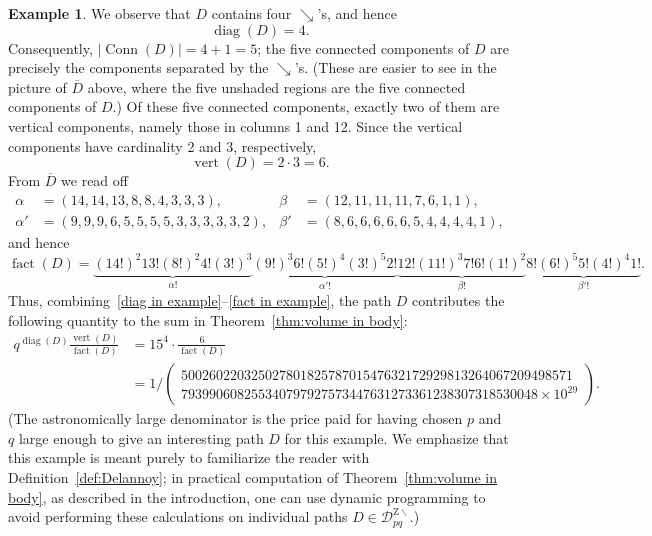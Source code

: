 \documentclass[noamsfonts,10pt]{amsart}
\newcommand{\DZ}{\mathcal{D}^{\mathrm{Z} \!\!\!\! \backslash}}
\newcommand{\al}{\alpha}
\newcommand{\be}{\beta}
\newcommand{\dd}{\operatorname{diag}}
\newcommand{\vv}{\operatorname{vert}}
\newcommand{\ff}{\operatorname{fact}}
\DeclareMathOperator{\Conn}{Conn}
\newcommand{\1}{\mathbf{1}}
\theoremstyle{plain}
\theoremstyle{definition}
\newtheorem{example}[theorem]{Example}
\numberwithin{equation}{section}
\begin{document}
\begin{example}
    \noindent We observe that $D$ contains four $\searrow$'s, and hence
    \begin{equation}
        \label{diag in example}
        \dd(D) = 4.
    \end{equation}
    Consequently, $\left|\Conn(D) \right| = 4+1=5$; the five connected components of $D$ are precisely the components separated by the $\searrow$'s.
    (These are easier to see in the picture of $\overline{D}$ above, where the five unshaded regions are the five connected components of $D$.)
    Of these five connected components, exactly two of them are vertical components, namely those in columns 1 and 12.
    Since the vertical components have cardinality 2 and 3, respectively,
    \begin{equation}
        \label{vert in example}
        \vv(D) = 2 \cdot 3 = 6.
    \end{equation}
    From $\overline{D}$ we read off
    \begin{align*}
        \al &= (14,14,13,8,8,4,3,3,3), & \be &= (12,11,11,11,7,6,1,1), \\
        \al' &= (9,9,9,6,5,5,5,5,3,3,3,3,3,2), & \be' &= (8,6,6,6,6,6,5,4,4,4,4,1),
    \end{align*}
    and hence
    \begin{equation}
        \label{fact in example}
        \ff(D) = \underbrace{(14!)^2 13! (8!)^2 4! (3!)^3}_{\al!} \underbrace{(9!)^3 6! (5!)^4 (3!)^5 2!}_{\al'!} \underbrace{12! (11!)^3 7! 6! (1!)^2}_{\be!} \underbrace{8! (6!)^5 5! (4!)^4 1!}_{\be' !}.
    \end{equation}
    Thus, combining~\eqref{diag in example}--\eqref{fact in example}, the path $D$ contributes the following quantity to the sum in Theorem~\ref{thm:volume in body}:
    \begin{align*}
        q^{\dd(D)} \frac{\vv(D)}{\ff(D)} &= 15^4 \cdot \frac{6}{\ff(D)} \\
        & = 1 \Big/ \left(  \begin{array}{l}
        50026022032502780182578701547632172929813264067209498571 \\
        793990608255340797927573447631273361238307318530048 \times 10^{29}
        \end{array}
        \right).
    \end{align*}
    (The astronomically large denominator is the price paid for having chosen $p$ and $q$ large enough to give an interesting path $D$ for this example.
    We emphasize that this example is meant purely to familiarize the reader with Definition~\ref{def:Delannoy}; in practical computation of Theorem~\ref{thm:volume in body}, as described in the introduction, one can use dynamic programming to avoid performing these calculations on individual paths $D \in \DZ_{pq}$.)

\end{example}
\end{document}
